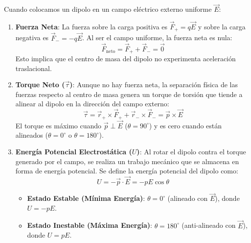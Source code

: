 \documentclass[12pt, a4paper]{article}
\begin{document}
Cuando colocamos un dipolo en un campo eléctrico externo uniforme $\vec{E}$:

\begin{enumerate}
    \item \textbf{Fuerza Neta}: La fuerza sobre la carga positiva es $\vec{F}_+ = q\vec{E}$ y sobre la carga negativa es $\vec{F}_- = -q\vec{E}$. Al ser el campo uniforme, la fuerza neta es nula:
    \begin{equation}
        \vec{F}_{\text{neto}} = \vec{F}_+ + \vec{F}_- = \vec{0}
    \end{equation}
    Esto implica que el centro de masa del dipolo no experimenta aceleración traslacional.
    
    \item \textbf{Torque Neto ($\vec{\tau}$)}: Aunque no hay fuerza neta, la separación física de las fuerzas respecto al centro de masa genera un torque de torsión que tiende a alinear al dipolo en la dirección del campo externo:
    \begin{equation}
        \vec{\tau} = \vec{r}_+ \times \vec{F}_+ + \vec{r}_- \times \vec{F}_- = \vec{p} \times \vec{E}
    \end{equation}
    El torque es máximo cuando $\vec{p} \perp \vec{E}$ ($\theta = 90^\circ$) y es cero cuando están alineados ($\theta = 0^\circ$ o $\theta = 180^\circ$).
    
    \item \textbf{Energía Potencial Electrostática ($U$)}: Al rotar el dipolo contra el torque generado por el campo, se realiza un trabajo mecánico que se almacena en forma de energía potencial. Se define la energía potencial del dipolo como:
    \begin{equation}
        U = -\vec{p} \cdot \vec{E} = -p E \cos\theta
    \end{equation}
    \begin{itemize}
        \item \textbf{Estado Estable (Mínima Energía)}: $\theta = 0^\circ$ (alineado con $\vec{E}$), donde $U = -pE$.
        \item \textbf{Estado Inestable (Máxima Energía)}: $\theta = 180^\circ$ (anti-alineado con $\vec{E}$), donde $U = pE$.
    \end{itemize}
\end{enumerate}
\end{document}
